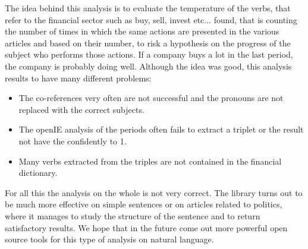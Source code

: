 The idea behind this analysis is to evaluate the temperature of the verbs, that refer to the financial sector such as buy, sell, invest etc... found, that is counting the number of times in which the same actions are presented in the various articles and based on their number, to risk a hypothesis on the progress of the subject who performs those actions. If a company buys a lot in the last period, the company is probably doing well.
Although the idea was good, this analysis results to have many different problems:
\begin{itemize}
\item
The co-references very often are not successful and the pronouns are not replaced with the correct subjects.
\item
The openIE analysis of the periods often fails to extract a triplet or the result not have the confidently to 1.
\item
Many verbs extracted from the triples are not contained in the financial dictionary.
\end{itemize}
For all this the analysis on the whole is not very correct.
The library turns out to be much more effective on simple sentences or on articles related to politics, where it manages to study the structure of the sentence and to return satisfactory results. We hope that in the future come out more powerful open source tools for this type of analysis on natural language.
